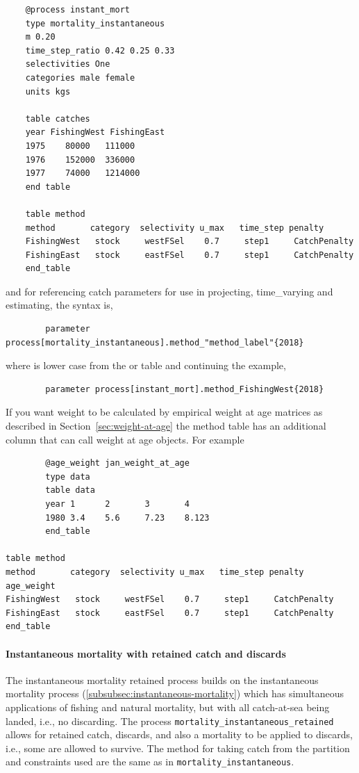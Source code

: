 {\small{\begin{verbatim}
	@process instant_mort
	type mortality_instantaneous
	m 0.20
	time_step_ratio 0.42 0.25 0.33
	selectivities One
	categories male female
	units kgs

	table catches
	year FishingWest FishingEast
	1975	80000	111000
	1976	152000	336000
	1977	74000	1214000
	end table

	table method
	method       category  selectivity u_max   time_step penalty
	FishingWest   stock     westFSel    0.7     step1     CatchPenalty
	FishingEast   stock     eastFSel    0.7     step1     CatchPenalty
	end_table
	\end{verbatim}}}

and for referencing catch parameters for use in projecting, time\_varying and estimating, the syntax is,
{\small{\begin{verbatim}
		parameter process[mortality_instantaneous].method_"method_label"{2018}
		\end{verbatim}}}
	where  is lower case from the  or  table and continuing the example,

{\small{\begin{verbatim}
		parameter process[instant_mort].method_FishingWest{2018}
		\end{verbatim}}}

If you want weight to be calculated by empirical weight at age matrices as described in Section~\ref{sec:weight-at-age} the method table has an additional column that can call weight at age objects. For example

{\small{\begin{verbatim}
		@age_weight jan_weight_at_age
		type data
		table data
		year 1 		2 		3 		4
		1980 3.4	5.6		7.23 	8.123
		end_table

table method
method       category  selectivity u_max   time_step penalty 		age_weight
FishingWest   stock     westFSel    0.7     step1     CatchPenalty
FishingEast   stock     eastFSel    0.7     step1     CatchPenalty
end_table
\end{verbatim}}}


\paragraph{Instantaneous mortality with retained catch and discards}\label{sec:inst-mort-retained}

The instantaneous mortality retained process builds on the instantaneous mortality process (\ref{subsubsec:instantaneous-mortality}) which has simultaneous applications of fishing and natural
mortality, but with all catch-at-sea being landed, i.e., no discarding. The process \texttt{mortality\_instantaneous\_retained} allows for retained catch, discards, and also a mortality to be applied to discards, i.e., some are allowed to survive. The method for taking catch from the partition and constraints used are the same as in \texttt{mortality\_instantaneous}.

